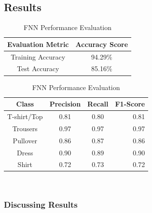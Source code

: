 \subsection{Results}

\begin{table}[!ht]
\begin{subtable}[c]{0.4\textwidth}
\footnotesize
\centering
\begin{tabular}{ c | c }
 \toprule
 Evaluation Metric & Accuracy Score  \\
 \midrule
 Training Accuracy & 94.29\% \\
 Test Accuracy & 85.16\% \\
 \bottomrule
\end{tabular}
\captionsetup{justification=centering,margin=1cm}
\end{subtable}
\begin{subtable}[c]{0.6\textwidth}
\footnotesize
\centering
\begin{tabular}{c | c c r}
Class & Precision & Recall & F1-Score\\
\midrule
T-shirt/Top   &    0.81  &    0.80  &    0.81 \\
Trousers   &    0.97  &    0.97  &    0.97 \\
Pullover   &    0.86  &    0.87  &    0.86\\
Dress   &    0.90  &    0.89  &    0.90\\
Shirt   &    0.72  &    0.73  &    0.72\\
\end{tabular}
\captionsetup{justification=centering,margin=1cm}
\end{subtable}
\caption{FNN Performance Evaluation}
\label{nn_evaluation}
\end{table}\\

\subsubsection{Discussing Results}







